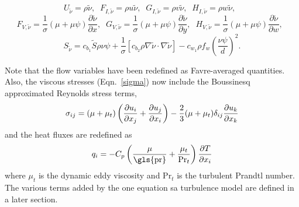 \begin{equation}
U_{\tilde\nu} = \rho\tilde\nu, \;\; 
F_{I, \tilde\nu} = \rho u \tilde\nu, \;\; 
G_{I, \tilde\nu} = \rho v \tilde\nu, \;\; 
H_{I, \tilde\nu} = \rho w \tilde\nu, \;\; 
\end{equation}
\begin{equation}
F_{V, \tilde\nu} = \frac{1}{\sigma}(\mu + \mu \psi)\frac{\partial \tilde \nu}{\partial x}, \;\;
G_{V, \tilde\nu} = \frac{1}{\sigma}(\mu + \mu \psi)\frac{\partial \tilde \nu}{\partial y}, \;\;
H_{V, \tilde\nu} = \frac{1}{\sigma}(\mu + \mu \psi)\frac{\partial \tilde \nu}{\partial w}, \;\;
\end{equation}
\begin{equation}
S_{\tilde\nu} = c_{b_1}\tilde S \rho\nu\psi + \frac{1}{\sigma}\left[c_{b_2}\rho\nabla\tilde\nu\cdot\nabla\tilde\nu\right] - c_{w_1}\rho f_w \left(\frac{\nu\psi}{d}\right)^2.
\end{equation}

Note that the flow variables have been redefined as Favre-averaged quantities. Also, the viscous stresses (Eqn.~\ref{sigma}) now include the Boussinesq approximated Reynolds stress terms,
\begin{equation}
\sigma_{ij} = (\mu+\mu_t)\left( \frac{\partial u_i}{\partial x_j}
+ \frac{\partial u_j}{\partial x_i} \right)
- \frac{2}{3}(\mu+\mu_t) \delta_{ij}\frac{\partial u_k}{\partial x_k}
\end{equation}
and the heat fluxes are redefined as
\begin{equation}
q_i = -C_p\l( \frac{\mu}{\mbox{\gls{pr}}} + \frac{\mu_t}{\text{Pr}_t}\r)\frac{\partial T}{\partial x_i}
\end{equation}
where $\mu_t$ is the dynamic eddy viscosity and $\text{Pr}_t$ is the turbulent Prandtl number. The various terms added by the one equation \gls{sa} turbulence model are defined in a later section.
